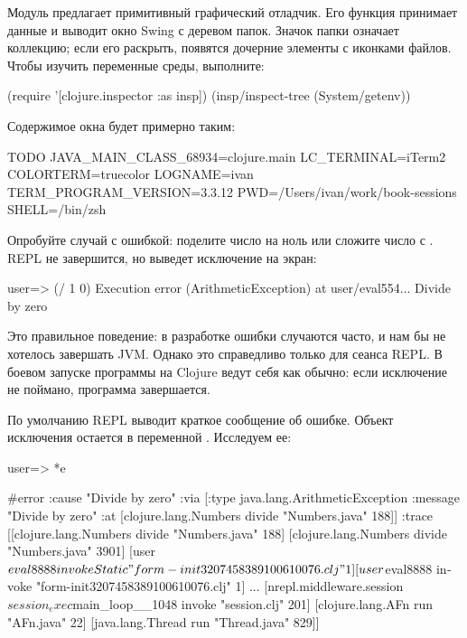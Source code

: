 Модуль  предлагает примитивный графический отладчик. Его функция  принимает данные и выводит окно Swing с деревом папок. Значок папки означает коллекцию; если его раскрыть, появятся дочерние элементы с иконками файлов. Чтобы изучить переменные среды, выполните:

\begin{english}
  \begin{clojure}
(require '[clojure.inspector :as insp])
(insp/inspect-tree (System/getenv))
  \end{clojure}
\end{english}

Содержимое окна будет примерно таким:

\begin{english}
  \begin{text}
TODO
{}
  JAVA_MAIN_CLASS_68934=clojure.main
  LC_TERMINAL=iTerm2
  COLORTERM=truecolor
  LOGNAME=ivan
  TERM_PROGRAM_VERSION=3.3.12
  PWD=/Users/ivan/work/book-sessions
  SHELL=/bin/zsh
  \end{text}
\end{english}

Опробуйте случай с ошибкой: поделите число на ноль или сложите число с . REPL не завершится, но выведет исключение на экран:

\begin{english}
  \begin{clojure}
user=> (/ 1 0)
Execution error (ArithmeticException) at user/eval554...
Divide by zero
  \end{clojure}
\end{english}

Это правильное поведение: в разработке ошибки случаются часто, и нам бы не хотелось завершать JVM. Однако это справедливо только для сеанса REPL. В боевом запуске программы на Clojure ведут себя как обычно: если исключение не поймано, программа завершается.

По умолчанию REPL выводит краткое сообщение об ошибке. Объект исключения остается в переменной . Исследуем ее:

\begin{english}
  \begin{clojure}
user=> *e

#error {
 :cause "Divide by zero"
 :via
 [{:type java.lang.ArithmeticException
   :message "Divide by zero"
   :at [clojure.lang.Numbers divide "Numbers.java" 188]}]
 :trace
 [[clojure.lang.Numbers divide "Numbers.java" 188]
  [clojure.lang.Numbers divide "Numbers.java" 3901]
  [user$eval8888 invokeStatic "form-init3207458389100610076.clj" 1]
  [user$eval8888 invoke "form-init3207458389100610076.clj" 1]
  ...
  [nrepl.middleware.session$session_exec$main_loop__1048 invoke "session.clj" 201]
  [clojure.lang.AFn run "AFn.java" 22]
  [java.lang.Thread run "Thread.java" 829]]}
  \end{clojure}
\end{english}

